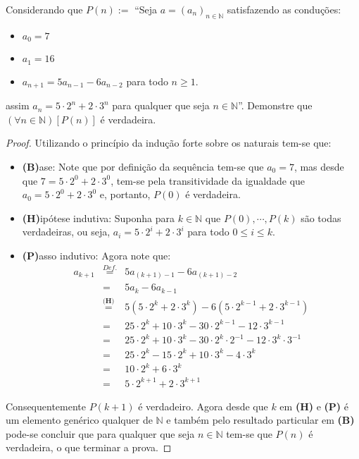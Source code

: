 \begin{exemplo}\label{exe:InducaoForte2}
	Considerando que $\displaystyle P(n) := $ ``Seja $a = (a_n)_{n \in \mathbb{N}}$ satisfazendo as conduções:
	\begin{itemize}
		\item $a_0 = 7$
		\item $a_1 = 16$
		\item $a_{n+1} = 5a_{n-1}  - 6a_{n-2}$ para todo $n \ge 1$.
	\end{itemize}
	assim $a_n = 5 \cdot 2^n + 2 \cdot 3^n$ para qualquer que seja $n \in \mathbb{N}$''. Demonstre que $(\forall n \in \mathbb{N})[P(n)]$ é verdadeira.
	
	\begin{proof}
		Utilizando o princípio da indução forte sobre os naturais tem-se que:
		\begin{itemize}
			\item[ ] \textbf{(B)}ase: Note que por definição da sequência tem-se que $a_0 = 7$, mas desde que $7 = 5 \cdot 2^0 + 2 \cdot 3^0$, tem-se pela transitividade da igualdade que $a_0 = 5 \cdot 2^0 + 2 \cdot 3^0$ e, portanto, $P(0)$ é verdadeira.
			\item[ ] \textbf{(H)}ipótese indutiva:  Suponha para $k \in \mathbb{N}$ que $P(0), \cdots, P(k)$ são todas verdadeiras, ou seja, $a_i = 5 \cdot 2^i + 2 \cdot 3^i$ para todo $0 \leq i \leq k$.
			\item[ ] \textbf{(P)}asso indutivo:  Agora note que:
			\begin{eqnarray*}
				a_{k+1} & \stackrel{Def.}{=} & 5a_{(k+1)-1}  - 6a_{(k+1)-2}\\
				& = &  5a_{k}  - 6a_{k-1}\\
				& \stackrel{\textbf{(H)}}{=} & 5(5\cdot 2^k + 2 \cdot 3^k) - 6(5\cdot 2^{k-1} + 2 \cdot 3^{k-1})\\
				& = & 25 \cdot 2^k + 10 \cdot 3^k - 30 \cdot 2^{k-1} - 12 \cdot 3^{k-1}\\
				& = &  25 \cdot 2^k + 10 \cdot 3^k - 30 \cdot 2^k \cdot 2^{-1} - 12 \cdot 3^{k} \cdot 3^{-1}\\
				& = & 25 \cdot 2^k - 15 \cdot 2^k + 10 \cdot 3^k - 4 \cdot 3^k\\
				& = & 10 \cdot 2^k + 6 \cdot 3^k\\
				& = & 5 \cdot 2^{k+1} + 2 \cdot 3^{k+1}
			\end{eqnarray*}
		\end{itemize}
		Consequentemente $P(k+1)$ é verdadeiro.  Agora desde que $k$ em \textbf{(H)} e \textbf{(P)} é um elemento genérico qualquer de $\mathbb{N}$ e também pelo resultado particular em  \textbf{(B)} pode-se concluir que para qualquer que seja $n \in \mathbb{N}$ tem-se que $P(n)$ é verdadeira, o que terminar a prova.
	\end{proof}
\end{exemplo}

